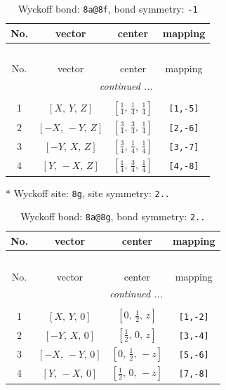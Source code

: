 \documentclass[fleqn,8pt]{jsarticle}
\begin{document}
\begin{longtable}{cccc}
\caption{Wyckoff bond: {\tt 8a@8f}, bond symmetry: {\tt -1}}
 \\
 \hline \hline
No. & vector & center & mapping \\ \hline \endfirsthead

\multicolumn{3}{l}{\tablename\ \thetable{}} \\
 \hline \hline
No. & vector & center & mapping \\ \hline \endhead

 \hline \hline
\multicolumn{3}{r}{\footnotesize\it continued ...} \\ \endfoot

 \hline \hline
\multicolumn{3}{r}{} \\ \endlastfoot

1 & $\left[ X,\, Y,\, Z \right]$ & $\left[ \frac{1}{4},\, \frac{1}{4},\, \frac{1}{4} \right]$ & {\tt [1,-5]} \\ \hline
2 & $\left[ - X,\, - Y,\, Z \right]$ & $\left[ \frac{3}{4},\, \frac{3}{4},\, \frac{1}{4} \right]$ & {\tt [2,-6]} \\ \hline
3 & $\left[ - Y,\, X,\, Z \right]$ & $\left[ \frac{3}{4},\, \frac{1}{4},\, \frac{1}{4} \right]$ & {\tt [3,-7]} \\ \hline
4 & $\left[ Y,\, - X,\, Z \right]$ & $\left[ \frac{1}{4},\, \frac{3}{4},\, \frac{1}{4} \right]$ & {\tt [4,-8]} \\
\end{longtable}
* Wyckoff site: {\tt 8g}, site symmetry: {\tt 2..}
\renewcommand{\arraystretch}{1.2}
\begin{longtable}{cccc}
\caption{Wyckoff bond: {\tt 8a@8g}, bond symmetry: {\tt 2..}}
 \\
 \hline \hline
No. & vector & center & mapping \\ \hline \endfirsthead

\multicolumn{3}{l}{\tablename\ \thetable{}} \\
 \hline \hline
No. & vector & center & mapping \\ \hline \endhead

 \hline \hline
\multicolumn{3}{r}{\footnotesize\it continued ...} \\ \endfoot

 \hline \hline
\multicolumn{3}{r}{} \\ \endlastfoot

1 & $\left[ X,\, Y,\, 0 \right]$ & $\left[ 0,\, \frac{1}{2},\, z \right]$ & {\tt [1,-2]} \\ \hline
2 & $\left[ - Y,\, X,\, 0 \right]$ & $\left[ \frac{1}{2},\, 0,\, z \right]$ & {\tt [3,-4]} \\ \hline
3 & $\left[ - X,\, - Y,\, 0 \right]$ & $\left[ 0,\, \frac{1}{2},\, - z \right]$ & {\tt [5,-6]} \\ \hline
4 & $\left[ Y,\, - X,\, 0 \right]$ & $\left[ \frac{1}{2},\, 0,\, - z \right]$ & {\tt [7,-8]} \\
\end{longtable}
\end{document}

